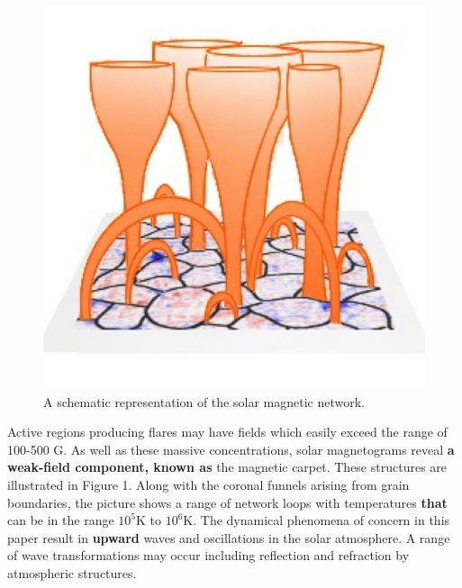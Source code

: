 \documentclass[physics,article,submit,pdftex,moreauthors]{Definitions/mdpi}
\begin{document}
\begin{figure}[h]\label{magneticnetwork}
\centering
\includegraphics[scale=0.3]{solar-network-v1.jpg}
\caption{A schematic representation of the solar magnetic network. 
}
\end{figure}

Active regions producing flares may have fields which easily exceed the %
range of 100-500 G. As well as these massive concentrations, solar magnetograms reveal 
{\bf a weak-field component, known as} the magnetic carpet. These structures are illustrated in Figure 1. Along with the coronal funnels arising from grain boundaries, the picture shows a range of network loops with temperatures {\bf that}  can be in the range $10^{5}$K to $10^{6}$K. The dynamical phenomena of concern in this paper result in {\bf upward} waves and oscillations in the solar atmosphere. 
A range of wave transformations may occur including reflection and refraction by atmospheric structures. 
\end{document}
